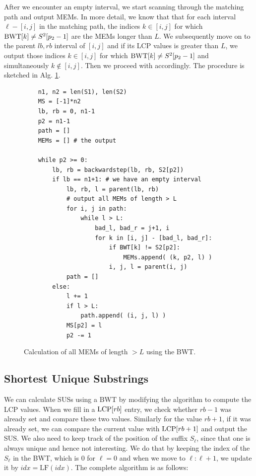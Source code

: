 After we encounter an empty interval, we start scanning through the matching path and output MEMs.
In more detail, we know that that for each interval $\ell - [i,j]$ in the matching path, the indices $k \in [i, j]$ for which $\text{BWT}[k] \neq S^2[p_2 - 1]$ are the MEMs longer than $L$.
We subsequently move on to the parent $lb, rb$ interval of $[i, j]$ and if its LCP values is greater than $L$, we output those indices $k \in [i, j]$ for which $\text{BWT}[k] \neq S^2[p_2 - 1]$ and simultaneously $k \notin [i, j]$.
Then we proceed with accordingly.
The procedure is sketched in Alg. \ref{alg:BWTMEMs}.

\begin{figure}[!ht]
    \centering
    \begin{verbatim}
    n1, n2 = len(S1), len(S2)
    MS = [-1]*n2
    lb, rb = 0, n1-1
    p2 = n1-1
    path = []
    MEMs = [] # the output
    
    while p2 >= 0:
        lb, rb = backwardstep(lb, rb, S2[p2])
        if lb == n1+1: # we have an empty interval
            lb, rb, l = parent(lb, rb)
            # output all MEMs of length > L
            for i, j in path:
                while l > L:
                    bad_l, bad_r = j+1, i 
                    for k in [i, j] - [bad_l, bad_r]:
                        if BWT[k] != S2[p2]:
                            MEMs.append( (k, p2, l) )
                        i, j, l = parent(i, j)
            path = []
        else:
            l += 1
            if l > L:
                path.append( (i, j, l) )
            MS[p2] = l
            p2 -= 1
    \end{verbatim}
    \caption{Calculation of all MEMs of length $> L$ using the BWT.}
    \label{alg:BWTMEMs}
\end{figure}

\subsection{Shortest Unique Substrings}
\label{sec:SUSBWT}
We can calculate SUSs using a BWT by modifying the algorithm to compute the LCP values.
When we fill in a $\text{LCP}[rb]$ entry, we check whether $rb-1$ was already set and compare these two values.
Similarly for the value $rb+1$, if it was already set, we can compare the current value with $\text{LCP}[rb+1]$ and output the SUS.
We also need to keep track of the position of the suffix $S_{\ell}$, since that one is always unique and hence not interesting.
We do that by keeping the index of the $S_{\ell}$ in the BWT, which is $0$ for $\ell = 0$ and when we move to $\ell : \ell + 1$, we update it by $idx = \text{LF}(idx)$.
The complete algorithm is as follows:

